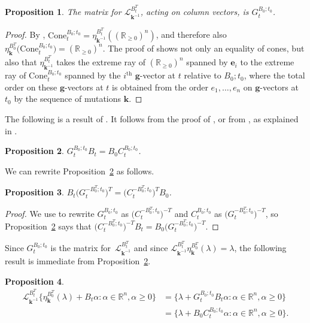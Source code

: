 \documentclass{amsart}
\newtheorem{proposition}{Proposition}[section]
\theoremstyle{definition}
\theoremstyle{remark}
\numberwithin{equation}{section}
\newcommand{\reals}{\mathbb R}
\newcommand{\sett}[1]{{\bigl\lbrace #1 \bigr\rbrace}}
\renewcommand{\th}{^\text{th}}
\newcommand{\0}{{\mathbf{0}}}
\newcommand{\Cone}{\mathrm{Cone}}
\newcommand{\g}{\mathbf{g}}
\newcommand{\kk}{{\boldsymbol{k}}}
\newcommand{\e}{\mathbf{e}}
\renewcommand{\L}{\mathcal{L}}
\renewcommand{\th}{^\text{th}}
\begin{document}
\begin{proposition}\label{L mat}
The matrix for $\L_{\kk^{-1}}^{B_t^T}$, acting on column vectors, is $G_t^{B_0;t_0}$.
\end{proposition}
\begin{proof}
By \cite[Proposition~8.13]{universal}, $\Cone^{B_0;t_0}_t=\eta_{\kk^{-1}}^{B_t^T}\left(\left(\reals_{\ge0}\right)^n\right)$, and therefore also ${\eta_\kk^{B_0^T}\bigl(\Cone^{B_0;t_0}_t\bigr)=\left(\reals_{\ge0}\right)^n}$.
The proof of \cite[Proposition~8.13]{universal} shows not only an equality of cones, but also that $\eta_{\kk^{-1}}^{B_t^T}$ takes the extreme ray of $\left(\reals_{\ge0}\right)^n$ spanned by $\e_i$ to the extreme ray of $\Cone^{B_0;t_0}_t$ spanned by the $i\th$ $\g$-vector at $t$ relative to $B_0;t_0$, where the total order on these $\g$-vectors at $t$ is obtained from the order $e_1,\ldots,e_n$ on $\g$-vectors at $t_0$ by the sequence of mutations $\kk$.
\end{proof}

The following is a result of \cite{NZ}.
It follows from the proof of \cite[Proposition~1.3]{NZ}, or from \cite[(6.14)]{ca4}, as explained in \cite[Remark~2.1]{NZ}.

\begin{proposition}\label{GBBC}
$G_t^{B_0;t_0}B_t=B_0C_t^{B_0;t_0}$.
\end{proposition}

We can rewrite Proposition~\ref{GBBC} as follows.

\begin{proposition}\label{BGCB}
$B_t\bigl(G_t^{-B_0^T;t_0}\bigr)^T=\bigl(C_t^{-B_0^T;t_0}\bigr)^TB_0$.
\end{proposition}
\begin{proof}
We use \cite[Theorem~1.2]{NZ} to rewrite $G_t^{B_0;t_0}$ as $\bigl(C_t^{-B_0^T;t_0}\bigr)^{-T}$ and $C_t^{B_0;t_0}$ as $\bigl(G_t^{-B_0^T;t_0}\bigr)^{-T}$, so Proposition~\ref{GBBC} says that $\bigl(C_t^{-B_0^T;t_0}\bigr)^{-T}B_t=B_0\bigl(G_t^{-B_0^T;t_0}\bigr)^{-T}$.
\end{proof}

Since $G_t^{B_0;t_0}$ is the matrix for~$\L_{\kk^{-1}}^{B_t^T}$ and since $\L_{\kk^{-1}}^{B_t^T}\eta_\kk^{B_0^T}(\lambda)=\lambda$, the following result is immediate from Proposition~\ref{GBBC}.

\begin{proposition}\label{B0C}
\begin{align*}
\L_{\kk^{-1}}^{B_t^T}\sett{\eta_\kk^{B_0^T}(\lambda)+B_t\alpha:\alpha\in\reals^n,\alpha\ge0}
&=\sett{\lambda+G_t^{B_0;t_0}B_t\alpha:\alpha\in\reals^n,\alpha\ge0}\\
&=\sett{\lambda+B_0C_t^{B_0;t_0}\alpha:\alpha\in\reals^n,\alpha\ge0}.
\end{align*}
\end{proposition}
\end{document}
